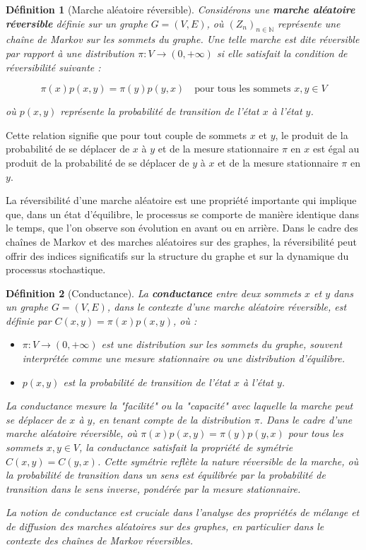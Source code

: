 \documentclass{article}
\theoremstyle{pasdepoint}
\newtheorem{definition}{Définition}
\theoremstyle{break}
\theoremstyle{pasdepoint}
\begin{document}
\begin{definition}[Marche aléatoire réversible]
    Considérons une \textbf{marche aléatoire réversible} définie sur un graphe $G = (V, E)$, où $(Z_n)_{n \in \mathbb{N}}$ représente une chaîne de Markov sur les sommets du graphe. Une telle marche est dite réversible par rapport à une distribution $\pi : V \rightarrow (0, +\infty)$ si elle satisfait la condition de réversibilité suivante :

    \[
    \pi(x)p(x, y) = \pi(y)p(y, x) \quad \text{pour tous les sommets } x, y \in V
    \]

    où $p(x, y)$ représente la probabilité de transition de l'état $x$ à l'état $y$.

\end{definition}

Cette relation signifie que pour tout couple de sommets $x$ et $y$, le produit de la probabilité de se déplacer de $x$ à $y$ et de la mesure stationnaire $\pi$ en $x$ est égal au produit de la probabilité de se déplacer de $y$ à $x$ et de la mesure stationnaire $\pi$ en $y$.

La réversibilité d'une marche aléatoire est une propriété importante qui implique que, dans un état d'équilibre, le processus se comporte de manière identique dans le temps, que l'on observe son évolution en avant ou en arrière. Dans le cadre des chaînes de Markov et des marches aléatoires sur des graphes, la réversibilité peut offrir des indices significatifs sur la structure du graphe et sur la dynamique du processus stochastique.
\begin{definition}[Conductance]
    La \textbf{conductance} entre deux sommets \(x\) et \(y\) dans un graphe \(G = (V, E)\), dans le contexte d'une marche aléatoire réversible, est définie par \(C(x, y) = \pi(x)p(x, y)\), où :
    \begin{itemize}
        \item \(\pi : V \rightarrow (0, +\infty)\) est une distribution sur les sommets du graphe, souvent interprétée comme une mesure stationnaire ou une distribution d'équilibre.
        \item \(p(x, y)\) est la probabilité de transition de l'état \(x\) à l'état \(y\).
    \end{itemize}

    La conductance mesure la "facilité" ou la "capacité" avec laquelle la marche peut se déplacer de \(x\) à \(y\), en tenant compte de la distribution \(\pi\). Dans le cadre d'une marche aléatoire réversible, où \(\pi(x)p(x, y) = \pi(y)p(y, x)\) pour tous les sommets \(x, y \in V\), la conductance satisfait la propriété de symétrie \(C(x, y) = C(y, x)\). Cette symétrie reflète la nature réversible de la marche, où la probabilité de transition dans un sens est équilibrée par la probabilité de transition dans le sens inverse, pondérée par la mesure stationnaire.

    La notion de conductance est cruciale dans l'analyse des propriétés de mélange et de diffusion des marches aléatoires sur des graphes, en particulier dans le contexte des chaînes de Markov réversibles.
\end{definition}
\end{document}
